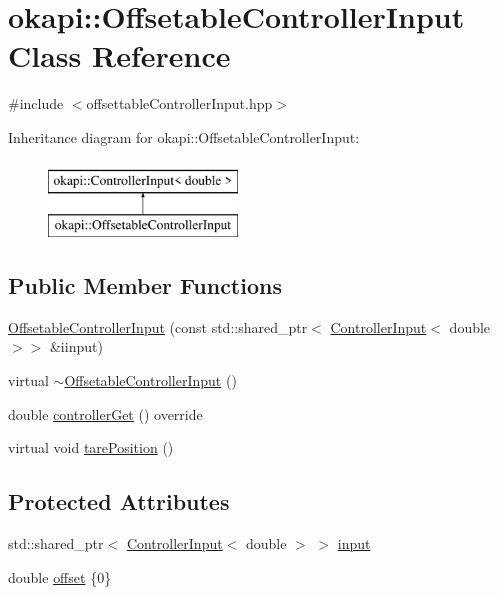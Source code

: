 \hypertarget{classokapi_1_1OffsetableControllerInput}{}\section{okapi\+::Offsetable\+Controller\+Input Class Reference}
\label{classokapi_1_1OffsetableControllerInput}


{\ttfamily \#include $<$offsettable\+Controller\+Input.\+hpp$>$}

Inheritance diagram for okapi\+::Offsetable\+Controller\+Input\+:\begin{figure}[H]
\begin{center}
\leavevmode
\includegraphics[height=2.000000cm]{classokapi_1_1OffsetableControllerInput}
\end{center}
\end{figure}
\subsection*{Public Member Functions}
\begin{DoxyCompactItemize}
\item 
\mbox{\hyperlink{classokapi_1_1OffsetableControllerInput_ac29065910ac48f3020638164812088e0}{Offsetable\+Controller\+Input}} (const std\+::shared\+\_\+ptr$<$ \mbox{\hyperlink{classokapi_1_1ControllerInput}{Controller\+Input}}$<$ double $>$$>$ \&iinput)
\item 
virtual \mbox{\hyperlink{classokapi_1_1OffsetableControllerInput_aaad20a6602e68e223ef6d31ef7597a65}{$\sim$\+Offsetable\+Controller\+Input}} ()
\item 
double \mbox{\hyperlink{classokapi_1_1OffsetableControllerInput_af51f93ac176113930ed07ee7b2b9b269}{controller\+Get}} () override
\item 
virtual void \mbox{\hyperlink{classokapi_1_1OffsetableControllerInput_ad55cc6173276690cd2f0d774a2c40731}{tare\+Position}} ()
\end{DoxyCompactItemize}
\subsection*{Protected Attributes}
\begin{DoxyCompactItemize}
\item 
std\+::shared\+\_\+ptr$<$ \mbox{\hyperlink{classokapi_1_1ControllerInput}{Controller\+Input}}$<$ double $>$ $>$ \mbox{\hyperlink{classokapi_1_1OffsetableControllerInput_a3909fcdd8f3605a0620473ba2ee0eb09}{input}}
\item 
double \mbox{\hyperlink{classokapi_1_1OffsetableControllerInput_a72b271a3893001de700d28256c5fbcd5}{offset}} \{0\}
\end{DoxyCompactItemize}


